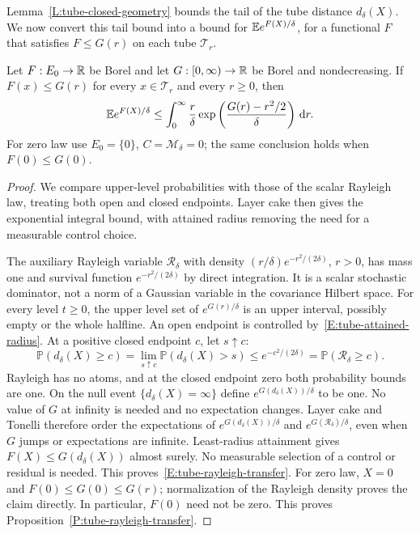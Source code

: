 

Lemma~\ref{L:tube-closed-geometry} bounds the tail of the tube distance
$d_\delta(X)$. We now convert this tail bound into a bound for
$\mathbb{E} e^{F(X)/\delta}$, for a functional $F$ that satisfies $F \le G(r)$ on each
tube $\mathcal{T}_r$.

\begin{proposition}
  \label{P:tube-rayleigh-transfer}
  Let $F:E_0 \to \mathbb{R}$ be Borel and let $G:[0,\infty) \to \mathbb{R}$ be Borel and
  nondecreasing. If $F(x) \le G(r)$ for every $x \in \mathcal{T}_r$ and every $r
  \ge 0$, then
  \begin{equation}\label{E:tube-rayleigh-transfer}
    \mathbb{E} e^{F(X)/\delta}
    \le\int_0^\infty\frac r\delta
    \exp\left(\frac{G(r)-r^2/2}{\delta}\right)\,\mathrm{d} r .
  \end{equation}
  For zero law use $E_0 = \{0\}$, $C = \mathcal{M}_\delta = 0$; the same
  conclusion holds when $F(0) \le G(0)$.
\end{proposition}

\begin{proof}
  We compare upper-level probabilities with those of the scalar Rayleigh law,
  treating both open and closed endpoints. Layer cake then gives the
  exponential integral bound, with attained radius removing the need for a
  measurable control choice.

  The auxiliary Rayleigh variable $\mathcal{R}_\delta$ with density
  $(r/\delta)e^{-r^2/(2\delta)}$, $r > 0$, has mass one and survival function
  $e^{-r^2/(2\delta)}$ by direct integration. It is a scalar stochastic
  dominator, not a norm of a Gaussian variable in the covariance Hilbert space.
  For every level $t \ge 0$, the upper level set of $e^{G(r)/\delta}$ is an
  upper interval, possibly empty or the whole halfline. An open endpoint is
  controlled by~\eqref{E:tube-attained-radius}. At a positive closed endpoint
  $c$, let $s\uparrow c$:
  \[
    \mathbb{P}(d_\delta(X)\ge c)
    =\lim_{s\uparrow c}\mathbb{P}(d_\delta(X)>s)
    \le e^{-c^2/(2\delta)}
    =\mathbb{P}(\mathcal{R}_\delta\ge c).
  \]
  Rayleigh has no atoms, and at the closed endpoint zero both probability bounds
  are one. On the null event $\{d_\delta(X)=\infty\}$ define
  $e^{G(d_\delta(X))/\delta}$ to be one. No value of $G$ at infinity is needed
  and no expectation changes. Layer cake and Tonelli therefore order the
  expectations of $e^{G(d_\delta(X))/\delta}$ and
  $e^{G(\mathcal{R}_\delta)/\delta}$, even when $G$ jumps or expectations are
  infinite. Least-radius attainment gives $F(X) \le G(d_\delta(X))$ almost
  surely. No measurable selection of a control or residual is needed. This
  proves~\eqref{E:tube-rayleigh-transfer}. For zero law, $X = 0$ and $F(0) \le
  G(0) \le G(r)$; normalization of the Rayleigh density proves the claim
  directly. In particular, $F(0)$ need not be zero. This proves
  Proposition~\ref{P:tube-rayleigh-transfer}.
\end{proof}

